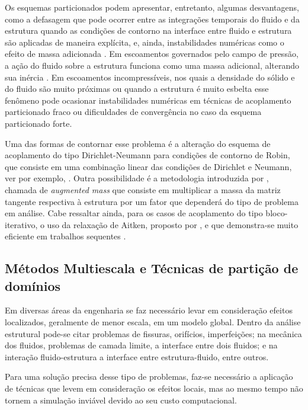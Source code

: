 \documentclass[tese_patricia.tex]{subfiles}
\begin{document}
Os esquemas particionados podem apresentar, entretanto, algumas desvantagens, como a defasagem que pode ocorrer entre as integrações temporais do fluido e da estrutura quando as condições de contorno na interface entre fluido e estrutura são aplicadas de maneira explícita, e, ainda, instabilidades numéricas como o efeito de massa adicionada \cite{FelippaPF:2001}. Em escoamentos governados pelo campo de pressão, a ação do fluido sobre a estrutura funciona como uma massa adicional, alterando sua inércia \cite{TallecM:2001}. Em escoamentos incompressíveis, nos quais a densidade do sólido e do fluido são muito próximas ou quando a estrutura é muito esbelta esse fenômeno pode ocasionar instabilidades numéricas em técnicas de acoplamento particionado fraco ou dificuldades de convergência no caso da esquema particionado forte. 

Uma das formas de contornar esse problema é a alteração do esquema de acoplamento do tipo Dirichlet-Neumann para condições de contorno de Robin, que consiste em uma combinação linear das condições de Dirichlet e Neumann, ver por exemplo, . Outra possibilidade é a metodologia introduzida por , chamada de \textit{augmented mass} que consiste em multiplicar a massa da matriz tangente respectiva à estrutura por um fator que dependerá do tipo de problema em análise. Cabe ressaltar ainda, para os casos de acoplamento do tipo bloco-iterativo, o uso da relaxação de Aitken, proposto por , e que demonstra-se muito eficiente em trabalhos sequentes \cite{KuttlerW:2008,FernandesCS:2019}.

 
\subsection{Métodos Multiescala e Técnicas de partição de domínios}
\label{arlequinsection}

Em diversas áreas da engenharia se faz necessário levar em consideração efeitos localizados, geralmente de menor escala, em um modelo global. Dentro da análise estrutural pode-se citar problemas de fissuras, orifícios, imperfeições; na mecânica dos fluidos, problemas de camada limite, a interface entre dois fluidos; e na interação fluido-estrutura a interface entre estrutura-fluido, entre outros.

Para uma solução precisa desse tipo de problemas, faz-se necessário a aplicação de técnicas que levem em consideração os efeitos locais, mas ao mesmo tempo não tornem a simulação inviável devido ao seu custo computacional.
\end{document}
